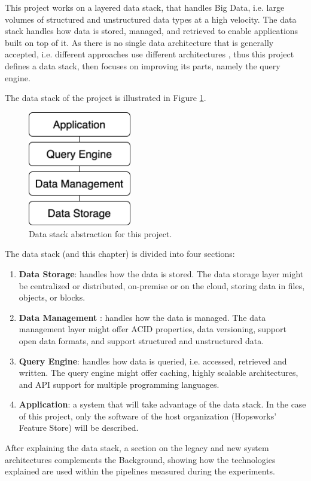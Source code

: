 This project works on a layered data stack, that handles Big Data, i.e. large volumes of structured and unstructured data types at a high velocity. The data stack handles how data is stored, managed, and retrieved to enable applications built on top of it. 
As there is no single data architecture that is generally accepted, i.e. different approaches use different architectures \cite{framptonCompleteGuideOpen2018,sakrBigDataProcessing2017}, thus this project defines a data stack, then focuses on improving its parts, namely the query engine. 

The data stack of the project is illustrated in Figure \ref{fig:data_stack}.

\begin{figure}[!ht]
    \begin{center}
      \includegraphics[width=0.4\textwidth]{figures/2-background/data_stack.png}
    \end{center}
    \caption[Data stack abstraction]{Data stack abstraction for this project.}
    \label{fig:data_stack}
\end{figure}

The data stack (and this chapter) is divided into four sections:
\begin{enumerate}
    \item \textbf{Data Storage}: handles how the data is stored. The data storage layer might be centralized or distributed, on-premise or on the cloud, storing data in files, objects, or blocks.
    \item \textbf{Data Management} : handles how the data is managed. The data management layer might offer \gls{ACID} properties, data versioning, support open data formats, and support structured and unstructured data.
    \item \textbf{Query Engine}: handles how data is queried, i.e. accessed, retrieved and written. The query engine might offer caching, highly scalable architectures, and \gls{API} support for multiple programming languages.
    \item \textbf{Application}: a system that will take advantage of the data stack. In the case of this project, only the software of the host organization (Hopsworks' Feature Store) will be described. 
\end{enumerate}
After explaining the data stack, a section on the legacy and new system architectures complements the Background, showing how the technologies explained are used within the pipelines measured during the experiments.
